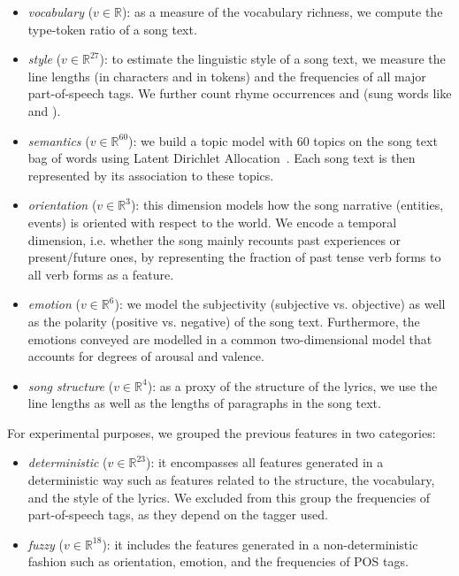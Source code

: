 \begin{itemize}
\item \textit{vocabulary} ($v \in \mathbb{R}$): as a measure of the vocabulary richness, we compute the type-token ratio of a song text.
\item \textit{style} ($v \in \mathbb{R}^{27}$): to estimate the linguistic style of a song text, we measure the line lengths (in characters and in tokens) and the frequencies of all major part-of-speech tags. We further count rhyme occurrences and  (sung words like  and ).
\item \textit{semantics} ($v \in \mathbb{R}^{60}$): we build a topic model with 60 topics on the song text bag of words using Latent Dirichlet Allocation~\cite{Blei2003}. Each song text is then represented by its association to these topics.
\item \textit{orientation} ($v \in \mathbb{R}^{3}$): this dimension models how the song narrative (entities, events) is oriented with respect to the world. We encode a temporal dimension, i.e. whether the song mainly recounts past experiences or present/future ones, by representing the fraction of past tense verb forms to all verb forms as a feature.
\item \textit{emotion} ($v \in \mathbb{R}^{6}$): we model the subjectivity (subjective vs. objective) as well as the polarity (positive vs. negative) of the song text. Furthermore, the emotions conveyed are modelled in a common two-dimensional model that accounts for degrees of arousal and valence.
\item \textit{song structure} ($v \in \mathbb{R}^{4}$): as a proxy of the structure of the lyrics, we use the line lengths as well as the lengths of paragraphs in the song text.
\end{itemize}

For experimental purposes, we grouped the previous features in two categories:

\begin{itemize}
\item \textit{deterministic} ($v \in \mathbb{R}^{23}$): it encompasses all features generated in a deterministic way such as features related to the structure, the vocabulary, and the style of the lyrics. We excluded from this group the frequencies of part-of-speech tags, as they depend on the tagger used.
\item \textit{fuzzy} ($v \in \mathbb{R}^{18}$): it includes the features generated in a non-deterministic fashion such as orientation, emotion, and the frequencies of POS tags.
\end{itemize}

